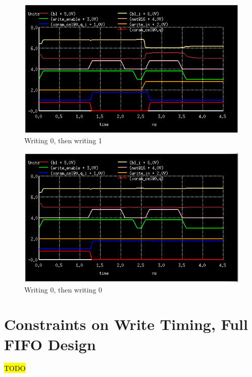\documentclass[12pt]{report}
\begin{document}
\begin{figure}[H]
  \centering
    \includegraphics[width=1.0\textwidth]{write_0_then_write_1.png}
  \caption{Writing 0, then writing 1}
  \label{fig:write_0_then_write_1}
\end{figure}

\begin{figure}[H]
  \centering
    \includegraphics[width=1.0\textwidth]{write_0_then_write_0.png}
  \caption{Writing 0, then writing 0}
  \label{fig:write_0_then_write_0}
\end{figure}

\section*{Constraints on Write Timing, Full FIFO Design}
\hl{TODO}
\end{document}
